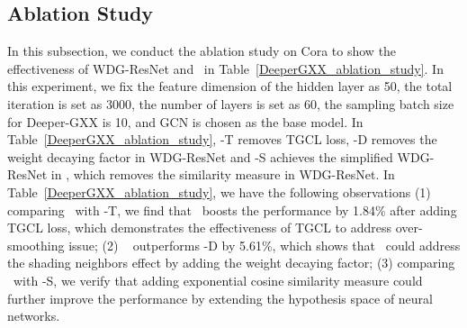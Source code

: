 \subsection{Ablation Study}
\label{deeperGXX_ablation}
In this subsection, we conduct the ablation study on Cora to show the effectiveness of WDG-ResNet and \layer\ in Table~\ref{DeeperGXX_ablation_study}. In this experiment, we fix the feature dimension of the hidden layer as 50, the total iteration is set as 3000, the number of layers is set as 60, the sampling batch size for Deeper-GXX is 10, and GCN is chosen as the base model. In Table~\ref{DeeperGXX_ablation_study}, \name-T removes TGCL loss, \name-D removes the weight decaying factor in WDG-ResNet and \name-S achieves the simplified WDG-ResNet in \name, which removes the similarity measure in WDG-ResNet.
In Table~\ref{DeeperGXX_ablation_study}, we have the following observations (1) comparing \name\ with \name-T, we find that \name\ boosts the performance by 1.84\% after adding TGCL loss, which demonstrates the effectiveness of TGCL to address over-smoothing issue; (2) \name~ outperforms \name-D by 5.61\%, which shows that \name\ could address the shading neighbors effect by adding the weight decaying factor; (3) comparing \name\ with \name-S, we verify that adding exponential cosine similarity measure  could further improve the performance by extending the hypothesis space of neural networks.








